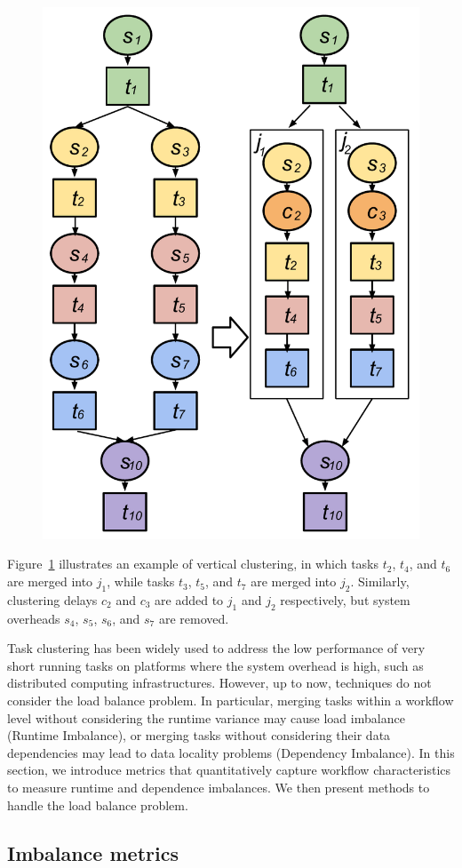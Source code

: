 \begin{figure}[!htb]
\centering
 \includegraphics[width=0.6\linewidth]{figures/balance/figure4.pdf}
  \label{fig:model_vc}
\end{figure}

Figure~\ref{fig:model_vc} illustrates an example of vertical clustering, in which tasks $t_2$, $t_4$, and $t_6$ are merged into $j_1$, while tasks $t_3$, $t_5$, and $t_7$ are merged into $j_2$. Similarly, clustering delays $c_2$ and $c_3$ are added to $j_1$ and $j_2$ respectively, but system overheads $s_4$, $s_5$, $s_6$, and $s_7$ are removed. 



Task clustering has been widely used to address the low performance of very short running tasks on platforms where the system overhead is high, such as distributed computing infrastructures. However, up to now, techniques do not consider the load balance problem. In particular, merging tasks within a workflow level without considering the runtime variance may cause load imbalance (Runtime Imbalance), or merging tasks without considering their data dependencies may lead to data locality problems (Dependency Imbalance). In this section, we introduce metrics that quantitatively capture workflow characteristics to measure runtime and dependence imbalances. We then present methods to handle the load balance problem.


\subsection{Imbalance metrics}

